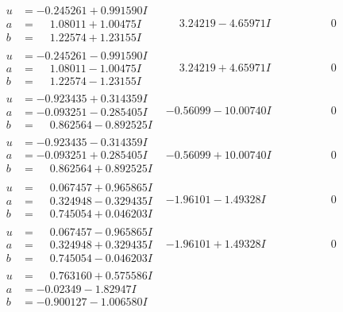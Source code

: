 \documentclass[1p]{elsarticle_modified}
\theoremstyle{definition}
\begin{document}
$$\begin{array}{c|c|c}
\begin{aligned}
u &= -0.245261 + 0.991590 I \\
a &= \phantom{-}1.08011 + 1.00475 I \\
b &= \phantom{-}1.22574 + 1.23155 I\end{aligned}
 & \phantom{-}3.24219 - 4.65971 I & \phantom{-0.000000 } 0 \\ \hline\begin{aligned}
u &= -0.245261 - 0.991590 I \\
a &= \phantom{-}1.08011 - 1.00475 I \\
b &= \phantom{-}1.22574 - 1.23155 I\end{aligned}
 & \phantom{-}3.24219 + 4.65971 I & \phantom{-0.000000 } 0 \\ \hline\begin{aligned}
u &= -0.923435 + 0.314359 I \\
a &= -0.093251 - 0.285405 I \\
b &= \phantom{-}0.862564 - 0.892525 I\end{aligned}
 & -0.56099 - 10.00740 I & \phantom{-0.000000 } 0 \\ \hline\begin{aligned}
u &= -0.923435 - 0.314359 I \\
a &= -0.093251 + 0.285405 I \\
b &= \phantom{-}0.862564 + 0.892525 I\end{aligned}
 & -0.56099 + 10.00740 I & \phantom{-0.000000 } 0 \\ \hline\begin{aligned}
u &= \phantom{-}0.067457 + 0.965865 I \\
a &= \phantom{-}0.324948 - 0.329435 I \\
b &= \phantom{-}0.745054 + 0.046203 I\end{aligned}
 & -1.96101 - 1.49328 I & \phantom{-0.000000 } 0 \\ \hline\begin{aligned}
u &= \phantom{-}0.067457 - 0.965865 I \\
a &= \phantom{-}0.324948 + 0.329435 I \\
b &= \phantom{-}0.745054 - 0.046203 I\end{aligned}
 & -1.96101 + 1.49328 I & \phantom{-0.000000 } 0 \\ \hline\begin{aligned}
u &= \phantom{-}0.763160 + 0.575586 I \\
a &= -0.02349 - 1.82947 I \\
b &= -0.900127 - 1.006580 I\end{aligned}

\end{array}$$
\end{document}
